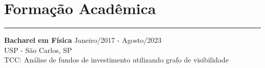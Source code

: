 \documentclass[10pt]{article}
\begin{document}
\vspace{-5pt}

\section*{Formação Acadêmica}
\vspace{-15pt}
\rule{\linewidth}{1pt}

{\bf Bacharel em Física} \hfill Janeiro/2017 - Agosto/2023\\
USP - São Carlos, SP\\
TCC: Análise de fundos de investimento utilizando grafo de visibilidade
\end{document}
